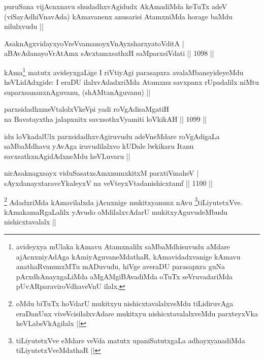 \begin{artha}
puruSana vijAcnxnavu shudadhxvAgidudx AkAmadiMda keTuTx adeV (viSayAdhiVnavAda) kAmavanenx anusarisi AtamxniMda horage baMdu nilulxvudu ||
\end{artha}


\begin{shl}
AsaknAgxvidayxyoVreVvamanoyxVnAyxsharxyatoVditA | \\
aBAvAdanayoVrAtAmx sAvxtamxsathxH saMparxsiVdati \hfill||  1098 ||  
\end{shl}

\begin{artha}
kAma\footnote{avideyxya mUlaka kAmavu Atamxnalilx saMbaMdhisuvudu aMdare ajAcnxniyAdAga kAmiyAguvaneMdathaR, kAmavidadxvanige kAmavu anathaRvanunxMTu mADuvudu, hiVge averaDU parasapxra guNa pArxdhAnayxgaLiMda aMgAMgiBAvadiMda oTuTx seVruvadariMda pUvARparaviroVdhaveVnU ilalx,} matutx avideyxgaLige I riVtiyAgi parasapxra avalaMbaneyideyeMdu heVLidAdxgide: I eraDU ilalxvAdadxriMda Atamxnu savxpanx rUpadalilx niMtu suparxsananxnAguvanu, (shAMtanAguvanu) ||
\end{artha}

\begin{shl}
parxsidadhxmeVtalolxVkeV\s pi yadi roVgAdisaMgatiH \\
na Bavatayxtha jalapxnitx savxsothxV\s yamiti loVkikAH \hfill ||  1099 || 
\end{shl}

\begin{artha}
idu loVkadalUlx parxsidadhxvAgiruvudu adeVneMdare roVgAdigaLa saMbaMdhavu yAvAga iruvudilalxvo kUDale lwkikaru Itanu savxsathxnAgidAdxneMdu heVLuvaru ||
\end{artha}


\begin{shl}
nirAsaknagxsayx viduSasatxsAmxnumxkitxM parxtiVmaheV | \\
sAyxdanayxtaraveYkaleyxV na veVteyxVtadanishicxtamf \hfill||  1100 ||  
\end{shl}

\begin{artha}
\footnote{oMdu biTuTx hoVdarU mukitxyu nishicxtavalalxveMdu tiLidiruvAga eraDanUnx viveVcisilalxvAdare mukitxyu nishicxtavalalxveMdu parxteyxVka heVLabeVkAgilalx ||}
AdadxriMda kAmavilalxda jAcnxnige mukitxyanunx nAvu \footnote{tiLiyutetxVve eMdare veVda matutx upaniSatutxgaLa adhayxyanadiMda tiLiyutetxVveMdathaR ||}tiLiyutetxVve. kAmakamaRgaLalilx yAvudo oMdilalxvAdarU mukitxyAguvudeMbudu nishicxtavalalx ||
\end{artha}

